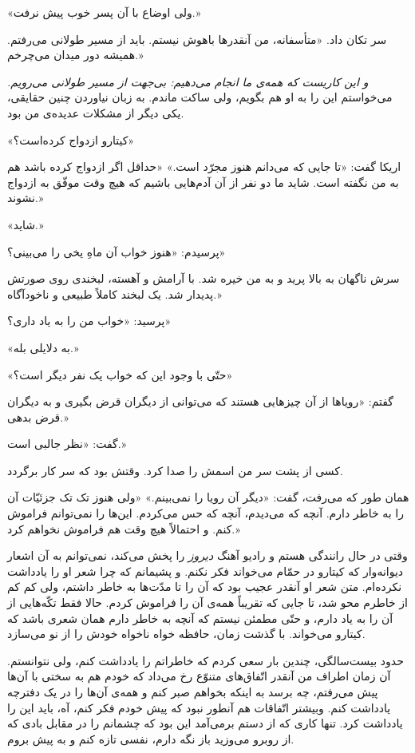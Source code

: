 \documentclass[a5paper]{book}
\begin{document}
«ولی اوضاع با آن پسر خوب پیش نرفت.»

سر تکان داد. «متأسفانه، من آنقدرها باهوش نیستم. باید از مسیر طولانی می‌رفتم. همیشه دور میدان می‌چرخم.»

\emph{
و این کاریست که همه‌ی ما انجام می‌دهیم: بی‌جهت از مسیر طولانی می‌رویم.
}
 می‌خواستم این را به او هم بگویم، ولی ساکت ماندم. به زبان نیاوردن چنین حقایقی، یکی دیگر از مشکلات عدیده‌ی من بود.
 
 «کیتارو ازدواج کرده‌است؟»
 
 اریکا گفت: «تا جایی که می‌دانم هنوز مجرّد است.» «حداقل اگر ازدواج کرده باشد هم به من نگفته است. شاید ما دو نفر از آن آدم‌هایی باشیم که هیچ وقت موفّق به ازدواج نشوند.»
 
 «شاید.»
 
 پرسیدم: «هنوز خواب آن ماهِ یخی را می‌بینی؟»
 
 سرش ناگهان به بالا پرید و به من خیره شد. با آرامش و آهسته، لبخندی روی صورتش پدیدار شد. یک لبخند کاملاً طبیعی و ناخودآگاه.»
 
 پرسید: «خواب من را به یاد داری؟»
 
 «به دلایلی بله.»
 
 «حتّی با وجود این که خواب یک نفر دیگر است؟»
 
 گفتم: «رویاها از آن چیزهایی هستند که می‌توانی از دیگران قرض بگیری و به دیگران قرض بدهی.»
 
 گفت: «نظر جالبی است.»
 
 کسی از پشت سر من اسمش را صدا کرد. وقتش بود که سر کار برگردد.
 
 همان طور که می‌رفت، گفت: «دیگر آن رویا را نمی‌بینم.» «ولی هنوز تک تک جزئیّات آن را به خاطر دارم. آنچه که می‌دیدم، آنچه که حس می‌کردم. این‌ها را نمی‌توانم فراموش کنم. و احتمالاً هیچ وقت هم فراموش نخواهم کرد.»
 
 وقتی در حال رانندگی هستم و رادیو آهنگ \emph{دیروز} را پخش می‌کند، نمی‌توانم به آن اشعار دیوانه‌وار که کیتارو در حمّام می‌خواند فکر نکنم. و پشیمانم که چرا شعر او را یادداشت نکرده‌ام. متن شعر او آنقدر عجیب بود که آن را تا مدّت‌ها به خاطر داشتم، ولی کم‌ کم از خاطرم محو شد، تا جایی که تقریباً همه‌ی آن را فراموش کردم. حالا فقط تکّه‌هایی از آن را به یاد دارم، و حتّی مطمئن نیستم که آنچه به خاطر دارم همان شعری باشد که کیتارو می‌خواند. با گذشت زمان، حافظه خواه ناخواه خودش را از نو می‌سازد.
 
 حدود بیست‌سالگی، چندین بار سعی کردم که خاطراتم را یادداشت کنم، ولی نتوانستم. آن زمان اطراف من آنقدر اتّفاق‌های متنوّع رخ می‌داد که خودم هم به سختی با آن‌ها پیش می‌رفتم، چه برسد به اینکه بخواهم صبر کنم و همه‌ی آن‌ها را در یک دفترچه یادداشت کنم. وبیشتر اتّفاقات هم آنطور نبود که پیش خودم فکر کنم، آه، باید این را یادداشت کرد.  تنها کاری که از دستم برمی‌آمد این بود که چشمانم را در مقابل بادی که از روبرو می‌وزید باز نگه دارم، نفسی تازه کنم و به پیش بروم.
 
\end{document}
